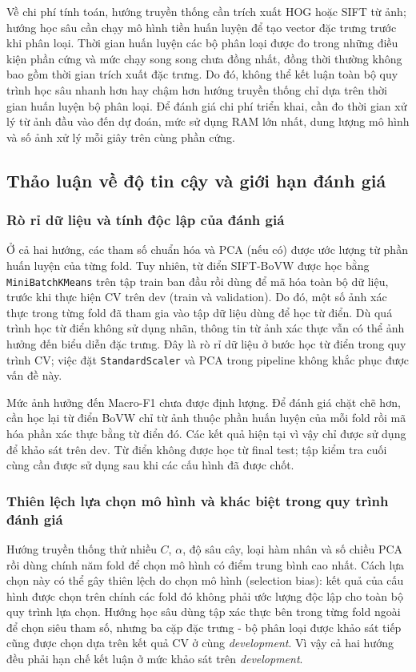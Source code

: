 Về chi phí tính toán, hướng truyền thống cần trích xuất HOG hoặc SIFT từ ảnh; hướng học sâu cần chạy mô hình tiền huấn luyện để tạo vector đặc trưng trước khi phân loại. Thời gian huấn luyện các bộ phân loại được đo trong những điều kiện phần cứng và mức chạy song song chưa đồng nhất, đồng thời thường không bao gồm thời gian trích xuất đặc trưng. Do đó, không thể kết luận toàn bộ quy trình học sâu nhanh hơn hay chậm hơn hướng truyền thống chỉ dựa trên thời gian huấn luyện bộ phân loại. Để đánh giá chi phí triển khai, cần đo thời gian xử lý từ ảnh đầu vào đến dự đoán, mức sử dụng RAM lớn nhất, dung lượng mô hình và số ảnh xử lý mỗi giây trên cùng phần cứng.

\subsection{Thảo luận về độ tin cậy và giới hạn đánh giá}
\label{sec:threats}
\subsubsection{Rò rỉ dữ liệu và tính độc lập của đánh giá}
Ở cả hai hướng, các tham số chuẩn hóa và PCA (nếu có) được ước lượng từ phần huấn luyện của từng fold. Tuy nhiên, từ điển SIFT-BoVW được học bằng \texttt{MiniBatchKMeans} trên tập train ban đầu rồi dùng để mã hóa toàn bộ dữ liệu, trước khi thực hiện CV trên dev (train và validation). Do đó, một số ảnh xác thực trong từng fold đã tham gia vào tập dữ liệu dùng để học từ điển. Dù quá trình học từ điển không sử dụng nhãn, thông tin từ ảnh xác thực vẫn có thể ảnh hưởng đến biểu diễn đặc trưng. Đây là rò rỉ dữ liệu ở bước học từ điển trong quy trình CV; việc đặt \texttt{StandardScaler} và PCA trong pipeline không khắc phục được vấn đề này.

Mức ảnh hưởng đến Macro-F1 chưa được định lượng. Để đánh giá chặt chẽ hơn, cần học lại từ điển BoVW chỉ từ ảnh thuộc phần huấn luyện của mỗi fold rồi mã hóa phần xác thực bằng từ điển đó. Các kết quả hiện tại vì vậy chỉ được sử dụng để khảo sát trên dev. Từ điển không được học từ final test; tập kiểm tra cuối cùng cần được sử dụng sau khi các cấu hình đã được chốt.

\subsubsection{Thiên lệch lựa chọn mô hình và khác biệt trong quy trình đánh giá}
Hướng truyền thống thử nhiều $C$, $\alpha$, độ sâu cây, loại hàm nhân và số chiều PCA rồi dùng chính năm fold để chọn mô hình có điểm trung bình cao nhất. Cách lựa chọn này có thể gây thiên lệch do chọn mô hình (selection bias): kết quả của cấu hình được chọn trên chính các fold đó không phải ước lượng độc lập cho toàn bộ quy trình lựa chọn. Hướng học sâu dùng tập xác thực bên trong từng fold ngoài để chọn siêu tham số, nhưng ba cặp đặc trưng - bộ phân loại được khảo sát tiếp cũng được chọn dựa trên kết quả CV ở cùng \textit{development}. Vì vậy cả hai hướng đều phải hạn chế kết luận ở mức khảo sát trên \textit{development}.

